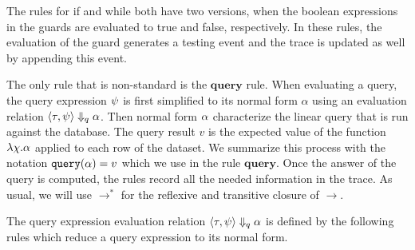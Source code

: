 The rules for if and while both have two versions, 
when the boolean expressions in the guards are evaluated to true and false, respectively. 
In these rules, the evaluation of the guard generates a testing event and the trace is updated as well by appending this event.

The only rule that is non-standard is the $\textbf{query}$ rule. When evaluating a query, the query expression $\psi$ is first simplified to its normal form $\alpha$ using an evaluation relation 
$\langle \mathtt{\tau}, \psi \rangle \Downarrow_q \alpha$. 
Then normal form $\alpha$ characterize the linear query that is run against the database. 
The query result $v$ is the expected value of the function $\lambda \chi.\alpha$ applied to each row of the dataset. 
We summarize this process with the notation ${\tt query}(\alpha) = v$ which we use in the rule $\textbf{query}$. 
Once the answer of the query is computed, the rules record all the needed information in the trace. 
As usual, we will use $\to^*$ for the reflexive and transitive closure of $\to$. 
 
The query expression evaluation relation  $\langle \mathtt{\tau}, \psi \rangle \Downarrow_q \alpha$ is defined by the following rules which reduce a query expression to its normal form.
{\small
{}
 }

